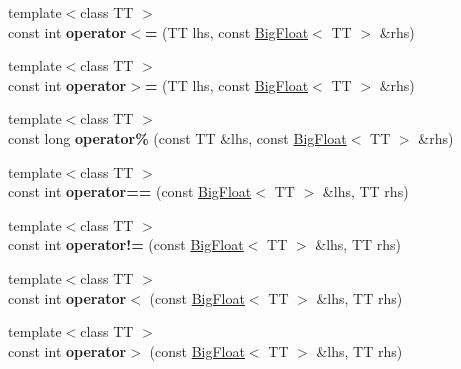 \begin{DoxyCompactItemize}
\item 
\hypertarget{classatl_1_1_big_float_ab54d5078f984f738c06005fadca42c24}{{\footnotesize template$<$class T\+T $>$ }\\const int {\bfseries operator$<$=} (T\+T lhs, const \hyperlink{classatl_1_1_big_float}{Big\+Float}$<$ T\+T $>$ \&rhs)}\label{classatl_1_1_big_float_ab54d5078f984f738c06005fadca42c24}

\item 
\hypertarget{classatl_1_1_big_float_a7556a58eca0ba55151ba8da7ceb0c7b9}{{\footnotesize template$<$class T\+T $>$ }\\const int {\bfseries operator$>$=} (T\+T lhs, const \hyperlink{classatl_1_1_big_float}{Big\+Float}$<$ T\+T $>$ \&rhs)}\label{classatl_1_1_big_float_a7556a58eca0ba55151ba8da7ceb0c7b9}

\item 
\hypertarget{classatl_1_1_big_float_ab38c8ef09412dfa6e7001b71ed4dabd9}{{\footnotesize template$<$class T\+T $>$ }\\const long {\bfseries operator\%} (const T\+T \&lhs, const \hyperlink{classatl_1_1_big_float}{Big\+Float}$<$ T\+T $>$ \&rhs)}\label{classatl_1_1_big_float_ab38c8ef09412dfa6e7001b71ed4dabd9}

\item 
\hypertarget{classatl_1_1_big_float_a88e73a4b1ccfe123414ebccde7ad8643}{{\footnotesize template$<$class T\+T $>$ }\\const int {\bfseries operator==} (const \hyperlink{classatl_1_1_big_float}{Big\+Float}$<$ T\+T $>$ \&lhs, T\+T rhs)}\label{classatl_1_1_big_float_a88e73a4b1ccfe123414ebccde7ad8643}

\item 
\hypertarget{classatl_1_1_big_float_a1f8a5cb665dad7a472cb8b2cfd824c62}{{\footnotesize template$<$class T\+T $>$ }\\const int {\bfseries operator!=} (const \hyperlink{classatl_1_1_big_float}{Big\+Float}$<$ T\+T $>$ \&lhs, T\+T rhs)}\label{classatl_1_1_big_float_a1f8a5cb665dad7a472cb8b2cfd824c62}

\item 
\hypertarget{classatl_1_1_big_float_a3a629512b1657ecfbdd7f0a32baa76e1}{{\footnotesize template$<$class T\+T $>$ }\\const int {\bfseries operator$<$} (const \hyperlink{classatl_1_1_big_float}{Big\+Float}$<$ T\+T $>$ \&lhs, T\+T rhs)}\label{classatl_1_1_big_float_a3a629512b1657ecfbdd7f0a32baa76e1}

\item 
\hypertarget{classatl_1_1_big_float_af6d8fb07c2802e15923269951d8fb15b}{{\footnotesize template$<$class T\+T $>$ }\\const int {\bfseries operator$>$} (const \hyperlink{classatl_1_1_big_float}{Big\+Float}$<$ T\+T $>$ \&lhs, T\+T rhs)}\label{classatl_1_1_big_float_af6d8fb07c2802e15923269951d8fb15b}


\end{DoxyCompactItemize}
